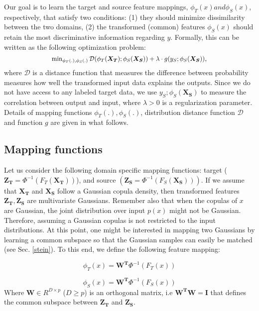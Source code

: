 \documentclass{article}
\newcommand{\todo}[1]{\textcolor{red}{#1}}
\begin{document}
	Our goal is to learn the target and source feature mappings, $\phi_T(x) and \phi_S(x)$, respectively, that satisfy two conditions: (1) they should  minimize dissimilarity between the two domains, (2) the transformed (common) features $\phi_S(x)$ should retain the most discriminative information regarding $y$. Formally, this can be written as the following optimization problem: %
\begin{equation} \Scale[0.92]{ \min_{ \phi_T(.), \phi_S(.) } \mathcal{D} ( \phi_T( \boldsymbol{X_T} ); \phi_S(\boldsymbol{X_S} )  ) + \lambda \cdot g(y_S; \phi_S(\boldsymbol{X_S} ) )  }  \label{eq1}, \end{equation}	
where $\mathcal{D}$ is a distance function that measures the difference between probability measures how well the transformed input data explains the outputs. Since we do not have access to any labeled target data, we use $y_S; \phi_S(\boldsymbol{X_S} )$ to measure the correlation between output and input, where $\lambda >0 $ is a regularization parameter. Details of mapping functions $\phi_T(.), \phi_S(.) $, distribution distance function $\mathcal{D}$ and function $g$ are given in what follows.
	
\subsection{Mapping functions }
	
Let us consider the following domain specific mapping functions: target ($\boldsymbol{Z_T}=\Phi^{-1}(F_T( \boldsymbol{X_T} ))$), and source $(\boldsymbol{Z_S} =\Phi^{-1}(F_S( \boldsymbol{X_S} )))$. If we assume that $\boldsymbol{X_T}$ and $\boldsymbol{X_S}$  follow a Gaussian copula density, then  transformed features $ \boldsymbol{Z_T},\boldsymbol{Z_S}$ are multivariate Gaussians. Remember also that when the copulas of $x$ are Gaussian, the joint distribution over input $p(x)$ might not be Gaussian. Therefore, assuming a Gaussian copulas is not restricted to the input distributions. At this point, one might be interested in mapping two Gaussians by learning a common subspace so that the Gaussian samples can easily be matched (see Sec. \ref{stein}). To this end, we define the following feature mapping:

	$$\phi_T(x)=\boldsymbol{W^T} \Phi^{-1}(F_T(x)) $$
	
	$$\phi_S(x)= \boldsymbol{W^T} \Phi^{-1}(F_S(x)) $$
	Where $\boldsymbol{W} \in R^{D \times p}$ ($D \geq p$) is an orthogonal matrix, i.e $\boldsymbol{W^T} \boldsymbol{W}=\boldsymbol{I}$ that defines the common subspace between $\boldsymbol{Z_T}$ and $\boldsymbol{Z_S}$.
	
\end{document}
